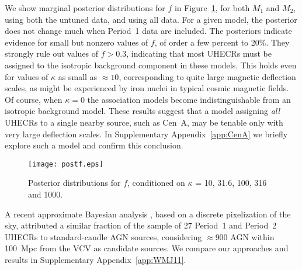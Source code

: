 We show marginal posterior distributions for $f$ in
Figure~\ref{fig:postf}, for both $M_1$ and $M_2$, using both the untuned
data, and using all data. For a given model, the posterior does not
change much when Period~1 data are included.  The posteriors indicate
evidence for small but nonzero values of $f$, of order a few percent to
20\%.  They strongly rule out values of $f>0.3$, indicating that most
UHECRs must be assigned to the isotropic background component in these
models.
This holds even for values of $\kappa$ as small as $\approx 10$,
corresponding to quite large magnetic deflection scales, as might be
experienced by iron nuclei in typical cosmic magnetic fields.  Of
course, when $\kappa=0$ the association models become indistinguishable
from an isotropic background model.  These results suggest that a model
assigning {\em all} UHECRs to a single nearby source, such as Cen~A, may be
tenable only with very large deflection scales.  In Supplementary
Appendix~\ref{app:CenA} we briefly explore such a model and confirm this
conclusion.

\begin{figure}
\centerline{\texttt{[image: postf.eps]}}
\caption{Posterior distributions for $f$, conditioned on $\kappa$ = 10,
31.6, 100, 316 and 1000.}
\label{fig:postf}
\end{figure}

A recent approximate Bayesian analysis \cite{WMJ11-BayesUHECR}, based on a
discrete pixelization of the sky, attributed a similar fraction of the
sample of 27 Period~1 and Period~2 UHECRs to standard-candle AGN sources,
considering $\approx 900$ AGN within 100~Mpc from the VCV as candidate
sources.  We compare our approaches and results in Supplementary
Appendix~\ref{app:WMJ11}.

